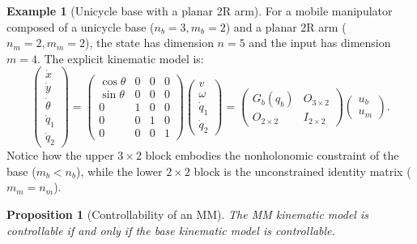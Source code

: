 \documentclass[11pt,a4paper]{article}
\def\bm#1{#1}%
\newcommand{\qbase}{\bm{q}_b}
\newcommand{\ubase}{\bm{u}_b}
\newcommand{\uarm}{\bm{u}_m}
\newcommand{\Gbase}{\bm{G}_b}
\theoremstyle{definition}
\newtheorem{example}[definition]{Example}
\theoremstyle{plain}
\newtheorem{proposition}[definition]{Proposition}
\theoremstyle{remark}
\begin{document}
\begin{example}[Unicycle base with a planar 2R arm]
For a mobile manipulator composed of a unicycle base ($n_b = 3, m_b = 2$) and a planar 2R arm ($n_m = 2, m_m = 2$), the state has dimension $n = 5$ and the input has dimension $m = 4$. The explicit kinematic model is:
\[
\begin{pmatrix}\dot x\\ \dot y\\ \dot\theta\\ \dot q_1\\ \dot q_2\end{pmatrix}
= \begin{pmatrix}
\cos\theta & 0 & 0 & 0\\
\sin\theta & 0 & 0 & 0\\
0 & 1 & 0 & 0\\
0 & 0 & 1 & 0\\
0 & 0 & 0 & 1
\end{pmatrix}
\begin{pmatrix}v\\ \omega\\ \dot q_1\\ \dot q_2\end{pmatrix}
= \begin{pmatrix}\Gbase(\qbase) & \bm O_{3\times 2}\\ \bm O_{2\times 2} & \bm I_{2\times 2}\end{pmatrix}
\begin{pmatrix}\ubase\\ \uarm\end{pmatrix}.
\]
Notice how the upper $3\times 2$ block embodies the nonholonomic constraint of the base ($m_b < n_b$), while the lower $2\times 2$ block is the unconstrained identity matrix ($m_m = n_m$).
\end{example}

\begin{proposition}[Controllability of an MM]\label{prop:ctrl}
The MM kinematic model is controllable if and only if the base kinematic model is controllable.
\end{proposition}
\end{document}
